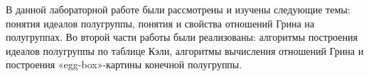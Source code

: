 \documentclass[bachelor, och, labwork]{shiza}
\begin{document}
	\newpage
	\conclusion %
	
	В данной лабораторной работе были рассмотрены и изучены следующие темы: понятия идеалов полугруппы, понятия и свойства отношений Грина на полугруппах. Во второй части работы были реализованы: алгоритмы построения идеалов полугруппы по таблице Кэли, алгоритмы вычисления отношений Грина и построения «egg-box»-картины конечной полугруппы.  
	  
	
	
	
\end{document}
